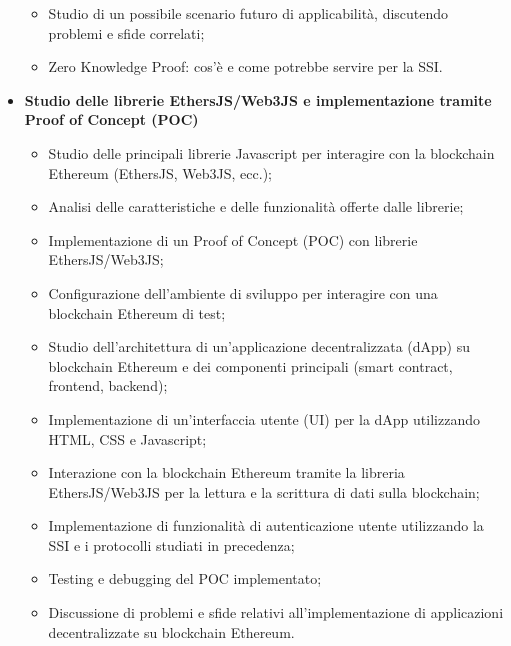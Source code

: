 \begin{itemize}
\begin{itemize}
        \item Studio di un possibile scenario futuro di applicabilità, discutendo problemi e sfide correlati;
        \item Zero Knowledge Proof: cos'è e come potrebbe servire per la SSI.
    \end{itemize}
    \item \textbf{Studio delle librerie EthersJS/Web3JS e implementazione tramite Proof of Concept (POC)} 
    \begin{itemize}
        \item Studio delle principali librerie Javascript per interagire con la blockchain Ethereum (EthersJS, Web3JS, ecc.);
        \item Analisi delle caratteristiche e delle funzionalità offerte dalle librerie;
        \item Implementazione di un Proof of Concept (POC) con librerie EthersJS/Web3JS;
        \item Configurazione dell'ambiente di sviluppo per interagire con una blockchain Ethereum di test;
        \item Studio dell'architettura di un'applicazione decentralizzata (dApp) su blockchain Ethereum e dei componenti principali (smart contract, frontend, backend);
        \item Implementazione di un'interfaccia utente (UI) per la dApp utilizzando HTML, CSS e Javascript;
        \item Interazione con la blockchain Ethereum tramite la libreria EthersJS/Web3JS per la lettura e la scrittura di dati sulla blockchain;
        \item Implementazione di funzionalità di autenticazione utente utilizzando la SSI e i protocolli studiati in precedenza;
        \item Testing e debugging del POC implementato;
        \item Discussione di problemi e sfide relativi all'implementazione di applicazioni decentralizzate su blockchain Ethereum.
    \end{itemize}
\end{itemize}